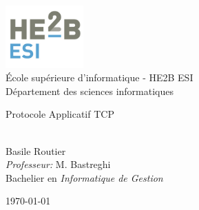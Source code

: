 \documentclass[french,a4paper,11pt,oneside]{book}
\begin{document}
    
    \frontmatter
    
    \begin{titlepage}      
        \begin{center}
            \includegraphics[width=3cm]{figures/logo.jpg}\\[0.5cm]
            {\LARGE École supérieure d'informatique - HE2B ESI\\[0.5cm]
            Département des sciences informatiques}\\[2cm]
			
            \linespread{1.2}\huge {
                Protocole Applicatif TCP
            
            }
            \linespread{1}~\\[2cm]
            {\Large 
                Basile Routier
            }\\[1cm] 
            

            {\large 
                \emph{Professeur:} M. Bastreghi}\\[1cm] %
            
            \large Bachelier en \textit{Informatique de Gestion}\\[0.3cm] 
            \vfill
            
            
            \today %
        \end{center}
    \end{titlepage}
    
\end{document}
